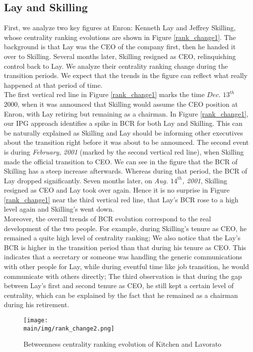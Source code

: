\documentclass[\main/thesis.tex]{subfiles}
\begin{document}
\subsection*{Lay and Skilling}
First, we analyze two key figures at Enron: Kenneth Lay and Jeffrey Skilling, whose centrality ranking evolutions are shown in Figure \ref{rank_change1}. The background is that Lay was the CEO of the company first, then he handed it over to Skilling. Several months later, Skilling resigned as CEO, relinquishing control back to Lay. We analyze their centrality ranking change during the transition periods. We expect that the trends in the figure can reflect what really happened at that period of time.\\  
The first vertical red line in Figure \ref{rank_change1} marks the time $\textit{Dec. $13^{th}$}$ $\textit{2000}$, when it was announced that Skilling would assume the CEO position at Enron, with Lay retiring but remaining as a chairman. In Figure \ref{rank_change1}, our IPG approach identifies a spike in BCR for both Lay and Skilling. This can be naturally explained as Skilling and Lay should be informing other executives about the transition right before it was about to be announced. The second event is during \textit{February, 2001} (marked by the second vertical red line), when Skilling made the official transition to CEO. We can see in the figure that the BCR of Skilling has a steep increase afterwards. Whereas during that period, the BCR of Lay dropped significantly. Seven months later, on \textit{Aug. $14^{th}$, 2001}, Skilling resigned as CEO and Lay took over again. Hence it is no surprise in Figure \ref{rank_change1} near the third vertical red line, that Lay's BCR rose to a high level again and Skilling's went down. \\
Moreover, the overall trends of BCR evolution correspond to the real development of the two people. For example, during Skilling's tenure as CEO, he remained a quite high level of centrality ranking; We also notice that the Lay's BCR is higher in the transition period than that during his tenure as CEO. This indicates that a secretary or someone was handling the generic communications with other people for Lay, while during eventful time like job transition, he would communicate with others directly; The third observation is that during the gap between Lay's first and second tenure as CEO, he still kept a certain level of centrality, which can be explained by the fact that he remained as a chairman during his retirement.

\begin{figure}
\centering
\texttt{[image: \\main/img/rank\_change2.png]}
\caption{Betweenness centrality ranking evolution of Kitchen and Lavorato}
\label{rank_change2}
\end{figure}
\end{document}
